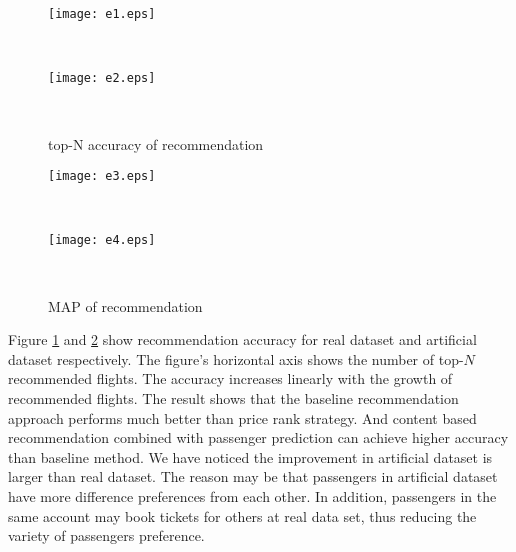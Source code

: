 \documentclass{llncs}
\begin{document}
\begin{figure}[!h]
              \begin{minipage}[t]{0.47\linewidth}
              \centering
              \texttt{[image: e1.eps]}\\
              \end{minipage}
              \begin{minipage}[t]{0.005\linewidth}~~~
              \end{minipage}
              \begin{minipage}[t]{0.47\linewidth}
              \centering
              \texttt{[image: e2.eps]}\\
              \end{minipage}
              \begin{minipage}[t]{0.005\linewidth}~~~
              \end{minipage}
              \caption{top-N accuracy of recommendation}
          \label{fig:top}
\end{figure}
\begin{figure}[!h]
              \begin{minipage}[t]{0.47\linewidth}
              \centering
              \texttt{[image: e3.eps]}\\
              \end{minipage}
              \begin{minipage}[t]{0.005\linewidth}~~~
              \end{minipage}
              \begin{minipage}[t]{0.47\linewidth}
              \centering
              \texttt{[image: e4.eps]}\\
              \end{minipage}
              \begin{minipage}[t]{0.005\linewidth}~~~
              \end{minipage}
              \caption{MAP of recommendation}
          \label{fig:rank}
\end{figure}\par
Figure \ref{fig:top} and \ref{fig:rank} show recommendation accuracy for real dataset and artificial dataset respectively. The figure's horizontal axis shows the number of top-$N$ recommended flights. The accuracy increases linearly with the growth of recommended flights. The result shows that the baseline recommendation approach performs much better than price rank strategy. And content based recommendation combined with passenger prediction can achieve higher accuracy than baseline method. We have noticed the improvement in artificial dataset is larger than real dataset. The reason may be that passengers in artificial dataset have more difference preferences from each other. In addition, passengers in the same account may book tickets for others at real data set, thus reducing the variety of passengers preference.
\end{document}
